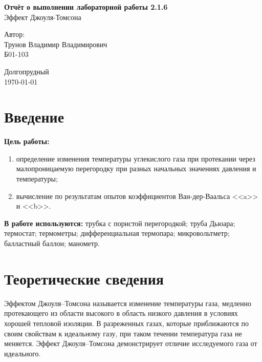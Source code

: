\documentclass[a4paper,12pt]{article} %
\date{\today}
\begin{document}
\begin{titlepage}
	
	\vspace{4.5cm}
	{\huge
		\begin{center}
			{\bf Отчёт о выполнении лабораторной работы 2.1.6}\\
			Эффект Джоуля-Томсона
		\end{center}
	}
	\vspace{8cm}
	\begin{flushright}
		{\LARGE Автор:\\ Трунов Владимир Владимирович \\
			\vspace{0.2cm}
			Б01-103}
	\end{flushright}
	\vspace{10cm}
	\begin{center}
		Долгопрудный\\
		\today
	\end{center}
\end{titlepage}


\section{Введение}
\textbf{Цель работы:}  \begin{enumerate}
	\item определение изменения температуры углекислого газа при протекании через малопроницаемую перегородку при разных начальных значениях давления и температуры;
	\item вычисление по результатам опытов коэффициентов Ван-дер-Ваальса <<a>> и <<b>>.
\end{enumerate}

\textbf{В работе используются:} трубка с пористой перегородкой; труба Дьюара; термостат; термометры; дифференциальная термопара; микровольтметр; балластный баллон; манометр.
\section{Теоретические сведения}

Эффектом Джоуля–Томсона называется изменение температуры газа, медленно протекающего из области высокого в область низкого давления в условиях хорошей тепловой изоляции. В разреженных газах, которые приближаются по своим свойствам к идеальному газу, при таком течении температура газа не меняется. Эффект Джоуля–Томсона демонстрирует отличие исследуемого газа от идеального.
\end{document}
